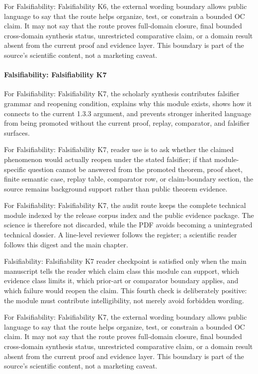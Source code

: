 For Falsifiability: Falsifiability K6, the external wording boundary allows public language to say that the route helps organize, test, or constrain a bounded OC claim. It may not say that the route proves full-domain closure, final bounded cross-domain synthesis status, unrestricted comparative claim, or a domain result absent from the current proof and evidence layer. This boundary is part of the source's scientific content, not a marketing caveat.


\paragraph{Falsifiability: Falsifiability K7}

For Falsifiability: Falsifiability K7, the scholarly synthesis contributes falsifier grammar and reopening condition, explains why this module exists, shows how it connects to the current 1.3.3 argument, and prevents stronger inherited language from being promoted without the current proof, replay, comparator, and falsifier surfaces.


For Falsifiability: Falsifiability K7, reader use is to ask whether the claimed phenomenon would actually reopen under the stated falsifier; if that module-specific question cannot be answered from the promoted theorem, proof sheet, finite semantic case, replay table, comparator row, or claim-boundary section, the source remains background support rather than public theorem evidence.


For Falsifiability: Falsifiability K7, the audit route keeps the complete technical module indexed by the release corpus index and the public evidence package. The science is therefore not discarded, while the PDF avoids becoming a unintegrated technical dossier. A line-level reviewer follows the register; a scientific reader follows this digest and the main chapter.


Falsifiability: Falsifiability K7 reader checkpoint is satisfied only when the main manuscript tells the reader which claim class this module can support, which evidence class limits it, which prior-art or comparator boundary applies, and which failure would reopen the claim. This fourth check is deliberately positive: the module must contribute intelligibility, not merely avoid forbidden wording.


For Falsifiability: Falsifiability K7, the external wording boundary allows public language to say that the route helps organize, test, or constrain a bounded OC claim. It may not say that the route proves full-domain closure, final bounded cross-domain synthesis status, unrestricted comparative claim, or a domain result absent from the current proof and evidence layer. This boundary is part of the source's scientific content, not a marketing caveat.


